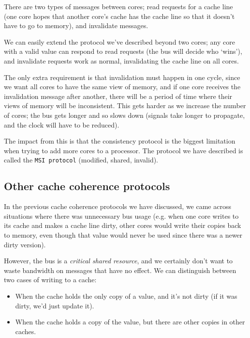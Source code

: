 There are two types of messages between cores; read requests for a cache line
(one core hopes that another core's cache has the cache line so that it doesn't
have to go to memory), and invalidate messages.

We can easily extend the protocol we've described beyond two cores; any core
with a valid value can respond to read requests (the bus will decide who
`wins'), and invalidate requests work as normal, invalidating the cache line on
all cores.

The only extra requirement is that invalidation must happen in one cycle, since
we want all cores to have the same view of memory, and if one core receives the
invalidation message after another, there will be a period of time where their
views of memory will be inconsistent. This gets harder as we increase the number
of cores; the bus gets longer and so slows down (signals take longer to
propagate, and the clock will have to be reduced).

The impact from this is that the consistency protocol is the biggest limitation
when trying to add more cores to a processor. The protocol we have described is
called the \texttt{MSI protocol} (modified, shared, invalid).


\subsection{Other cache coherence protocols}

In the previous cache coherence protocols we have discussed, we came across
situations where there was unnecessary bus usage (e.g. when one core writes to
its cache and makes a cache line dirty, other cores would write their copies
back to memory, even though that value would never be used since there was a
newer dirty version).

However, the bus is a \textit{critical shared resource}, and we certainly don't
want to waste bandwidth on messages that have no effect. We can distinguish
between two cases of writing to a cache:

\begin{itemize}
  \item When the cache holds the only copy of a value, and it's not dirty (if it
  was dirty, we'd just update it).
  \item When the cache holds a copy of the value, but there are other copies in
  other caches.
\end{itemize}

